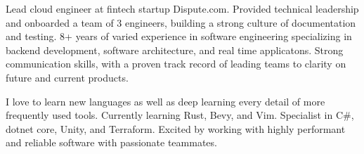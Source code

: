 

\begin{cvparagraph}

Lead cloud engineer at fintech startup Dispute.com. Provided technical leadership and onboarded a team of 3 engineers, building a strong culture of documentation and testing.
8+ years of varied experience in software engineering specializing in backend development, software architecture, and real time applicatons.
Strong communication skills, with a proven track record of leading teams to clarity on future and current products.

I love to learn new languages as well as deep learning every detail of more frequently used tools. Currently learning Rust, Bevy, and Vim. Specialist in C\#, dotnet core, Unity, and Terraform.
Excited by working with highly performant and reliable software with passionate teammates.

\end{cvparagraph}
